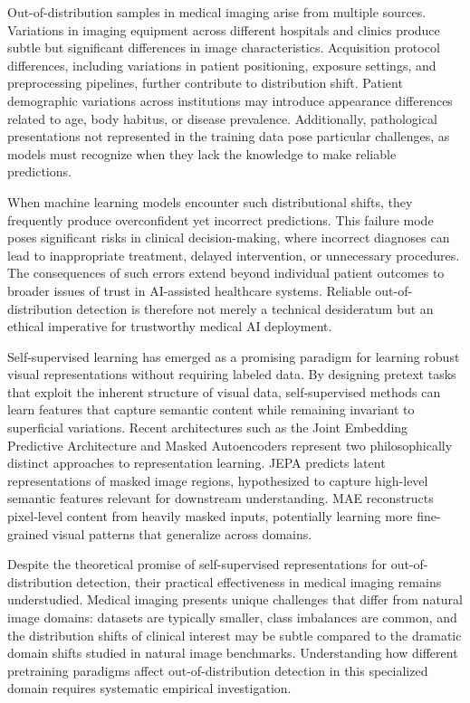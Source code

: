 \documentclass[11pt,a4paper]{article}
\begin{document}
Out-of-distribution samples in medical imaging arise from multiple sources. Variations in imaging equipment across different hospitals and clinics produce subtle but significant differences in image characteristics. Acquisition protocol differences, including variations in patient positioning, exposure settings, and preprocessing pipelines, further contribute to distribution shift. Patient demographic variations across institutions may introduce appearance differences related to age, body habitus, or disease prevalence. Additionally, pathological presentations not represented in the training data pose particular challenges, as models must recognize when they lack the knowledge to make reliable predictions.

When machine learning models encounter such distributional shifts, they frequently produce overconfident yet incorrect predictions. This failure mode poses significant risks in clinical decision-making, where incorrect diagnoses can lead to inappropriate treatment, delayed intervention, or unnecessary procedures. The consequences of such errors extend beyond individual patient outcomes to broader issues of trust in AI-assisted healthcare systems. Reliable out-of-distribution detection is therefore not merely a technical desideratum but an ethical imperative for trustworthy medical AI deployment.

Self-supervised learning has emerged as a promising paradigm for learning robust visual representations without requiring labeled data. By designing pretext tasks that exploit the inherent structure of visual data, self-supervised methods can learn features that capture semantic content while remaining invariant to superficial variations. Recent architectures such as the Joint Embedding Predictive Architecture and Masked Autoencoders represent two philosophically distinct approaches to representation learning. JEPA predicts latent representations of masked image regions, hypothesized to capture high-level semantic features relevant for downstream understanding. MAE reconstructs pixel-level content from heavily masked inputs, potentially learning more fine-grained visual patterns that generalize across domains.

Despite the theoretical promise of self-supervised representations for out-of-distribution detection, their practical effectiveness in medical imaging remains understudied. Medical imaging presents unique challenges that differ from natural image domains: datasets are typically smaller, class imbalances are common, and the distribution shifts of clinical interest may be subtle compared to the dramatic domain shifts studied in natural image benchmarks. Understanding how different pretraining paradigms affect out-of-distribution detection in this specialized domain requires systematic empirical investigation.
\end{document}
